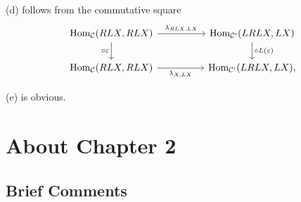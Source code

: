 \documentclass[12pt]{article}%
\theoremstyle{remark}
\theoremstyle{definition}
\newcommand{\C}{\mathcal C}
\newcommand{\ee}{\varepsilon}
\DeclareMathOperator{\Hom}{Hom}%
\begin{document}
(d) follows from the commutative square 
$$
\begin{tikzcd}
\Hom_\C(RLX,RLX)\ar{d}[swap]{\circ\ee}\ar{rr}{\lambda_{RLX,LX}}&&\Hom_{\C'}(LRLX,LX)\ar{d}{\circ L(\ee)}\\
\Hom_\C(RLX,RLX)\ar{rr}[swap]{\lambda_{X,LX}}&&\Hom_{\C'}(LRLX,LX),
\end{tikzcd}
$$ 

(e) is obvious.


\section{About Chapter 2}

\subsection{Brief Comments}
\end{document}
